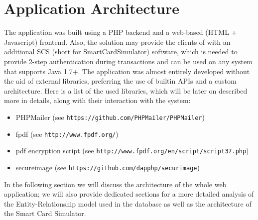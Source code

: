 \chapter{Application Architecture}\label{chapter:application_architecture}
The \gnb{} application was built using a PHP backend and a web-based (HTML + Javascript) frontend. Also, the solution may provide the clients of \gnb{} with an additional SCS (short for SmartCardSimulator) software, which is needed to provide 2-step authentication during transactions and can be used on any system that supports Java 1.7+.\newline
The application was almost entirely developed without the aid of external libraries, preferring the use of builtin APIs and a custom architecture. Here is a list of the used libraries, which will be later on described more in details, along with their interaction with the system:
\begin{itemize}
	\item PHPMailer (see \texttt{https://github.com/PHPMailer/PHPMailer})
	\item fpdf (see \texttt{http://www.fpdf.org/})
	\item pdf encryption script (see \texttt{http://www.fpdf.org/en/script/script37.php})
	\item secureimage (see \texttt{https://github.com/dapphp/securimage})
\end{itemize}

In the following section we will discuss the architecture of the whole web application; we will also provide dedicated sections for a more detailed analysis of the Entity-Relationship model used in the database as well as the architecture of the Smart Card Simulator.

